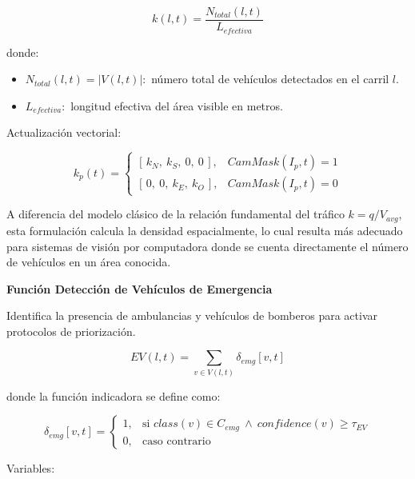 \documentclass[12pt,a4paper,oneside]{report}
\begin{document}
\begin{equation}
k(l,t) = \frac{N_{total}(l,t)}{L_{efectiva}}
\label{eq:densidad}
\end{equation}

donde:

\begin{itemize}
\item
  \(N_{total}(l,t) = \left| V(l,t) \right|:\) número total de vehículos detectados en el carril \(l\).
\item
  \(L_{efectiva}:\) longitud efectiva del área visible en metros.
\end{itemize}

Actualización vectorial:

\begin{equation}
k_{p}(t) =
\begin{cases}
\left[\, k_{N},\ k_{S},\ 0,\ 0 \,\right], & CamMask(I_{p},t) = 1\\[2pt]
\left[\, 0,\ 0,\ k_{E},\ k_{O} \,\right], & CamMask(I_{p},t) = 0
\end{cases}
\end{equation}

A diferencia del modelo clásico de la relación fundamental del tráfico \(k = q/V_{avg}\), esta formulación calcula la densidad espacialmente, lo cual resulta más adecuado para sistemas de visión por computadora donde se cuenta directamente el número de vehículos en un área conocida.

\textbf{Función Detección de Vehículos de Emergencia}

Identifica la presencia de ambulancias y vehículos de bomberos para activar protocolos de priorización.

\begin{equation}
EV(l,t) = \sum_{v \in V(l,t)}\delta_{emg}[v,t]
\label{eq:ev}
\end{equation}

donde la función indicadora se define como:

\begin{equation}
\delta_{emg}[v,t] =
\begin{cases}
1, & \text{si } class(v) \in C_{emg} \ \land\ confidence(v) \geq \tau_{EV}\\[2pt]
0, & \text{caso contrario}
\end{cases}
\end{equation}

Variables:
\end{document}
